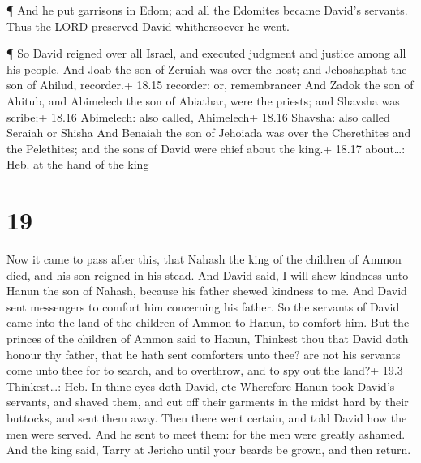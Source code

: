  ¶ And he put garrisons in Edom; and all the Edomites
became David's servants. Thus the LORD preserved David whithersoever he
went.

 ¶ So David reigned over all Israel, and executed judgment
and justice among all his people.  And Joab the son of
Zeruiah was over the host; and Jehoshaphat the son of Ahilud, recorder.+
18.15 recorder: or, remembrancer  And Zadok the son of
Ahitub, and Abimelech the son of Abiathar, were the priests; and Shavsha
was scribe;+ 18.16 Abimelech: also called, Ahimelech+ 18.16 Shavsha:
also called Seraiah or Shisha  And Benaiah the son of
Jehoiada was over the Cherethites and the Pelethites; and the sons of
David were chief about the king.+ 18.17 about\ldots: Heb. at the hand of
the king

\hypertarget{section-18}{%
\section{19}\label{section-18}}

 Now it came to pass after this, that Nahash the king of the
children of Ammon died, and his son reigned in his stead. 
And David said, I will shew kindness unto Hanun the son of Nahash,
because his father shewed kindness to me. And David sent messengers to
comfort him concerning his father. So the servants of David came into
the land of the children of Ammon to Hanun, to comfort him. 
But the princes of the children of Ammon said to Hanun, Thinkest thou
that David doth honour thy father, that he hath sent comforters unto
thee? are not his servants come unto thee for to search, and to
overthrow, and to spy out the land?+ 19.3 Thinkest\ldots: Heb. In thine
eyes doth David, etc  Wherefore Hanun took David's servants,
and shaved them, and cut off their garments in the midst hard by their
buttocks, and sent them away.  Then there went certain, and
told David how the men were served. And he sent to meet them: for the
men were greatly ashamed. And the king said, Tarry at Jericho until your
beards be grown, and then return.

